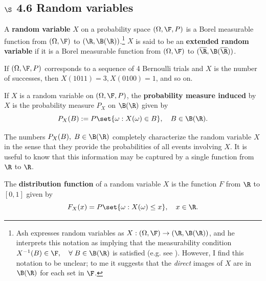 \documentclass{article} %
\begin{document}
\subsection{$\S$ 4.6 Random variables}

\begin{definition}
A \textbf{random variable} $X$ on a probability space $(\Omega, \F, P)$ is a Borel measurable function from $(\Omega, \F)$ to $(\R, \B(\R))$.\footnote{Ash expresses random variables as $X : (\Omega, \F) \to (\R, \B(\R))$, and he interprets this notation as implying that the measurability condition $X^{-1}(B) \in \F, \quad \forall \; B \in \B(\R)$ is satisfied (e.g. see \cite[pp.176, top paragraph before Sec 4.7]{ash2000probability}). However, I find this notation to be unclear; to me it suggests that the \textit{direct} images of $X$ are in $\B(\R)$ for each set in $\F$.}   $X$ is said to be an \textbf{extended random variable}  if it is a Borel measurable function from $(\Omega, \F)$ to $(\overline{\R}, \B(\overline{\R}))$. 
\end{definition}

\begin{example}
If $(\Omega, \F, P)$ corresponds to a sequence of 4 Bernoulli trials \cite[Sec.~4.4]{ash2000probability} and $X$ is the number of successes, then $X(1 0 1 1) =3, X(0 1 0 0 ) = 1$, and so on.	
\end{example}


\begin{definition}
If $X$ is a random variable on  $(\Omega, \F, P)$, the \textbf{probability measure induced} by $X$ is the probability measure $P_X$ on $\B(\R)$ given by
\[  P_X(B) := P\set{\omega : X(\omega) \in B}, \quad B \in \B(\R). \] 
\end{definition}

The numbers $P_X(B), \; B \in \B(\R)$ completely characterize the random variable $X$ in the sense that they provide the probabilities of all events involving $X$.  It is useful to know that this information may be captured by a single function from $\R$ to $\R$.

\begin{definition}
The \textbf{distribution function} of a random variable $X$ is the function $F$ from $\R$ to $[0,1]$ given by 
\[F_X(x) = P\set{\omega : X(\omega) \leq x}, \quad x \in \R.\]
\label{def:distribution_function_of_random_variable}
\end{definition}
\end{document}
